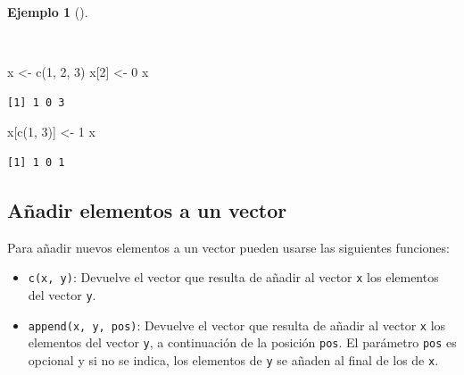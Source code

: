 \documentclass[
  a4paper,
]{scrreport}
\newenvironment{Shaded}{\begin{snugshade}}{\end{snugshade}}
\newcommand{\DecValTok}[1]{\textcolor[rgb]{0.68,0.00,0.00}{#1}}
\newcommand{\FunctionTok}[1]{\textcolor[rgb]{0.28,0.35,0.67}{#1}}
\newcommand{\NormalTok}[1]{\textcolor[rgb]{0.00,0.23,0.31}{#1}}
\newcommand{\OtherTok}[1]{\textcolor[rgb]{0.00,0.23,0.31}{#1}}
\providecommand{\tightlist}{%
  \setlength{\itemsep}{0pt}\setlength{\parskip}{0pt}}\usepackage{longtable,booktabs,array}
\theoremstyle{definition}
\theoremstyle{definition}
\newtheorem{example}{Ejemplo}[chapter]
\theoremstyle{remark}
\begin{document}
\begin{example}[]\protect\hypertarget{exm-modificacion-vectores}{}\label{exm-modificacion-vectores}

~

\begin{Shaded}
\begin{Highlighting}[]
\NormalTok{x }\OtherTok{\textless{}{-}} \FunctionTok{c}\NormalTok{(}\DecValTok{1}\NormalTok{, }\DecValTok{2}\NormalTok{, }\DecValTok{3}\NormalTok{)}
\NormalTok{x[}\DecValTok{2}\NormalTok{] }\OtherTok{\textless{}{-}} \DecValTok{0}
\NormalTok{x}
\end{Highlighting}
\end{Shaded}

\begin{verbatim}
[1] 1 0 3
\end{verbatim}

\begin{Shaded}
\begin{Highlighting}[]
\NormalTok{x[}\FunctionTok{c}\NormalTok{(}\DecValTok{1}\NormalTok{, }\DecValTok{3}\NormalTok{)] }\OtherTok{\textless{}{-}} \DecValTok{1}
\NormalTok{x}
\end{Highlighting}
\end{Shaded}

\begin{verbatim}
[1] 1 0 1
\end{verbatim}

\end{example}

\subsection{Añadir elementos a un
vector}\label{auxf1adir-elementos-a-un-vector}

Para añadir nuevos elementos a un vector pueden usarse las siguientes
funciones:

\begin{itemize}
\tightlist
\item
  \texttt{c(x,\ y)}: Devuelve el vector que resulta de añadir al vector
  \texttt{x} los elementos del vector \texttt{y}.
\item
  \texttt{append(x,\ y,\ pos)}: Devuelve el vector que resulta de añadir
  al vector \texttt{x} los elementos del vector \texttt{y}, a
  continuación de la posición \texttt{pos}. El parámetro \texttt{pos} es
  opcional y si no se indica, los elementos de \texttt{y} se añaden al
  final de los de \texttt{x}.
\end{itemize}
\end{document}
